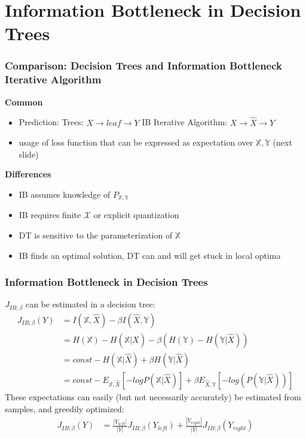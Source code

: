 \section[IB in Trees]{Information Bottleneck in Decision Trees} %
\begin{frame}
    \frametitle{Comparison: Decision Trees and Information Bottleneck Iterative Algorithm}
    
    \textbf{Common}
    \begin{itemize}
        \item Prediction: \newline
        Trees: $X \rightarrow leaf \rightarrow Y$ \newline
        IB Iterative Algorithm: $X \rightarrow \hat{X} \rightarrow Y$
        \item usage of loss function that can be expressed as expectation over $\mathbb{X}, \mathbb{Y}$ (next slide)
    \end{itemize}
    \textbf{Differences}
    \begin{itemize}
        \item IB assumes knowledge of $P_{\mathbb{X}, \mathbb{Y}}$
        \item IB requires finite $\mathcal{X}$ or explicit quantization
        \item DT is sensitive to the parameterization of $\mathbb{X}$
        \item IB finds an optimal solution, DT can and will get stuck in local optima
    \end{itemize}
\end{frame}


\begin{frame}
    \frametitle{Information Bottleneck in Decision Trees}

    $J_{IB;\beta}$ can be estimated in a decision tree:
    \begin{align*}
        J_{IB;\beta}(Y) &= I(\mathbb{X}, \hat{X}) - \beta I(\hat{X}, \mathbb{Y}) \\
        &= H(\mathbb{X}) - H(\mathbb{X}|\hat{X}) - \beta (H(\mathbb{Y}) - H(\mathbb{Y} | \hat{X})) \\
        &= const - H(\mathbb{X}|\hat{X}) + \beta H(\mathbb{Y} | \hat{X}) \\
        &= const - E_{\mathbb{X},\hat{X}}[-log P(\mathbb{X}|\hat{X})] + \beta E_{\hat{X},\mathbb{Y}}[-log(P(\mathbb{Y}|\hat{X}))]
        \label{eq:2}
    \end{align*}
    These expectations can easily (but not necessarily accurately) be estimated from samples, and greedily optimized:
    \begin{align*}
        J_{IB;\beta}(Y) &= \frac{|Y_{left}|}{|Y|} J_{IB;\beta}(Y_{left}) + \frac{|Y_{right}|}{|Y|} J_{IB;\beta}(Y_{right})
    \end{align*}
\end{frame}


